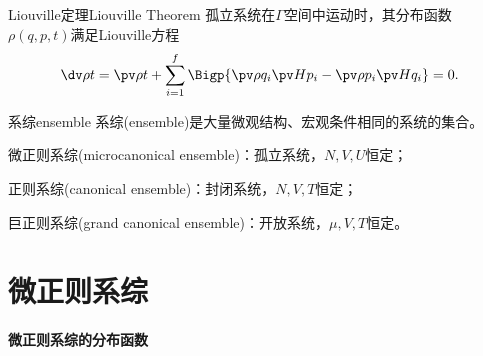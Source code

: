 \begin{theorem}
	{Liouville定理}{Liouville Theorem}
	孤立系统在$\varGamma$空间中运动时，其分布函数$\rho(q,p,t)$满足Liouville方程
	\begin{equation}
		\dv\rho t=\pv\rho t+\sum_{i=1}^f\Bigp{\pv\rho{q_i}\pv H{p_i}-\pv\rho{p_i}\pv H{q_i}}=0.
	\end{equation}
\end{theorem}



\begin{definition}{系综}{ensemble}
	系综(ensemble)是大量微观结构、宏观条件相同的系统的集合。
	\begin{compactitem}
		\item 微正则系综(microcanonical ensemble)：孤立系统，$N,V,U$恒定；
		\item 正则系综(canonical ensemble)：封闭系统，$N,V,T$恒定；
		\item 巨正则系综(grand canonical ensemble)：开放系统，$\mu,V,T$恒定。
	\end{compactitem}
\end{definition}

\section{微正则系综}
\label{sec:microcanonical}



\paragraph{微正则系综的分布函数}

